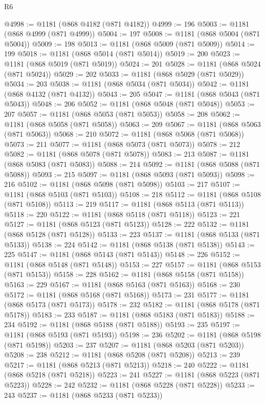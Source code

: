 \begin{lexlean}{R6}
\begin{coremodule}
@4998 := @1181 (@868 @4182 (@871 @4182))
@4999 := 196
@5003 := @1181 (@868 @4999 (@871 @4999))
@5004 := 197
@5008 := @1181 (@868 @5004 (@871 @5004))
@5009 := 198
@5013 := @1181 (@868 @5009 (@871 @5009))
@5014 := 199
@5018 := @1181 (@868 @5014 (@871 @5014))
@5019 := 200
@5023 := @1181 (@868 @5019 (@871 @5019))
@5024 := 201
@5028 := @1181 (@868 @5024 (@871 @5024))
@5029 := 202
@5033 := @1181 (@868 @5029 (@871 @5029))
@5034 := 203
@5038 := @1181 (@868 @5034 (@871 @5034))
@5042 := @1181 (@868 @4132 (@871 @4132))
@5043 := 205
@5047 := @1181 (@868 @5043 (@871 @5043))
@5048 := 206
@5052 := @1181 (@868 @5048 (@871 @5048))
@5053 := 207
@5057 := @1181 (@868 @5053 (@871 @5053))
@5058 := 208
@5062 := @1181 (@868 @5058 (@871 @5058))
@5063 := 209
@5067 := @1181 (@868 @5063 (@871 @5063))
@5068 := 210
@5072 := @1181 (@868 @5068 (@871 @5068))
@5073 := 211
@5077 := @1181 (@868 @5073 (@871 @5073))
@5078 := 212
@5082 := @1181 (@868 @5078 (@871 @5078))
@5083 := 213
@5087 := @1181 (@868 @5083 (@871 @5083))
@5088 := 214
@5092 := @1181 (@868 @5088 (@871 @5088))
@5093 := 215
@5097 := @1181 (@868 @5093 (@871 @5093))
@5098 := 216
@5102 := @1181 (@868 @5098 (@871 @5098))
@5103 := 217
@5107 := @1181 (@868 @5103 (@871 @5103))
@5108 := 218
@5112 := @1181 (@868 @5108 (@871 @5108))
@5113 := 219
@5117 := @1181 (@868 @5113 (@871 @5113))
@5118 := 220
@5122 := @1181 (@868 @5118 (@871 @5118))
@5123 := 221
@5127 := @1181 (@868 @5123 (@871 @5123))
@5128 := 222
@5132 := @1181 (@868 @5128 (@871 @5128))
@5133 := 223
@5137 := @1181 (@868 @5133 (@871 @5133))
@5138 := 224
@5142 := @1181 (@868 @5138 (@871 @5138))
@5143 := 225
@5147 := @1181 (@868 @5143 (@871 @5143))
@5148 := 226
@5152 := @1181 (@868 @5148 (@871 @5148))
@5153 := 227
@5157 := @1181 (@868 @5153 (@871 @5153))
@5158 := 228
@5162 := @1181 (@868 @5158 (@871 @5158))
@5163 := 229
@5167 := @1181 (@868 @5163 (@871 @5163))
@5168 := 230
@5172 := @1181 (@868 @5168 (@871 @5168))
@5173 := 231
@5177 := @1181 (@868 @5173 (@871 @5173))
@5178 := 232
@5182 := @1181 (@868 @5178 (@871 @5178))
@5183 := 233
@5187 := @1181 (@868 @5183 (@871 @5183))
@5188 := 234
@5192 := @1181 (@868 @5188 (@871 @5188))
@5193 := 235
@5197 := @1181 (@868 @5193 (@871 @5193))
@5198 := 236
@5202 := @1181 (@868 @5198 (@871 @5198))
@5203 := 237
@5207 := @1181 (@868 @5203 (@871 @5203))
@5208 := 238
@5212 := @1181 (@868 @5208 (@871 @5208))
@5213 := 239
@5217 := @1181 (@868 @5213 (@871 @5213))
@5218 := 240
@5222 := @1181 (@868 @5218 (@871 @5218))
@5223 := 241
@5227 := @1181 (@868 @5223 (@871 @5223))
@5228 := 242
@5232 := @1181 (@868 @5228 (@871 @5228))
@5233 := 243
@5237 := @1181 (@868 @5233 (@871 @5233))

\end{coremodule}
\end{lexlean}
